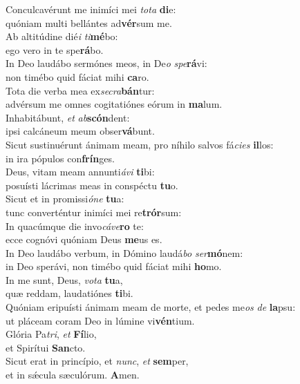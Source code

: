 \evenverse Conculcavérunt me inimíci mei \textit{to}\textit{ta} \textbf{di}e:~\*\\
\evenverse quóniam multi bellántes ad\textbf{vér}sum me.\\
\oddverse Ab altitúdine dié\textit{i} \textit{ti}\textbf{mé}bo:~\*\\
\oddverse ego vero in te spe\textbf{rá}bo.\\
\evenverse In Deo laudábo sermónes meos, in De\textit{o} \textit{spe}\textbf{rá}vi:~\*\\
\evenverse non timébo quid fáciat mihi \textbf{ca}ro.\\
\oddverse Tota die verba mea ex\textit{se}\textit{cra}\textbf{bán}tur:~\*\\
\oddverse advérsum me omnes cogitatiónes eórum in \textbf{ma}lum.\\
\evenverse Inhabitábunt, \textit{et} \textit{ab}\textbf{scón}dent:~\*\\
\evenverse ipsi calcáneum meum obser\textbf{vá}bunt.\\
\oddverse Sicut sustinuérunt ánimam meam, pro níhilo salvos fá\textit{ci}\textit{es} \textbf{il}los:~\*\\
\oddverse in ira pópulos con\textbf{frín}ges.\\
\evenverse Deus, vitam meam annunti\textit{á}\textit{vi} \textbf{ti}bi:~\*\\
\evenverse posuísti lácrimas meas in conspéctu \textbf{tu}o.\\
\oddverse Sicut et in promissi\textit{ó}\textit{ne} \textbf{tu}a:~\*\\
\oddverse tunc converténtur inimíci mei re\textbf{trór}sum:\\
\evenverse In quacúmque die invo\textit{cá}\textit{ve}\textbf{ro} te:~\*\\
\evenverse ecce cognóvi quóniam Deus \textbf{me}us es.\\
\oddverse In Deo laudábo verbum, in Dómino laudá\textit{bo} \textit{ser}\textbf{mó}nem:~\*\\
\oddverse in Deo sperávi, non timébo quid fáciat mihi \textbf{ho}mo.\\
\evenverse In me sunt, Deus, \textit{vo}\textit{ta} \textbf{tu}a,~\*\\
\evenverse quæ reddam, laudatiónes \textbf{ti}bi.\\
\oddverse Quóniam eripuísti ánimam meam de morte, et pedes me\textit{os} \textit{de} \textbf{la}psu:~\*\\
\oddverse ut pláceam coram Deo in lúmine vi\textbf{vén}tium.\\
\evenverse Glória Pa\textit{tri}, \textit{et} \textbf{Fí}lio,~\*\\
\evenverse et Spirítui \textbf{San}cto.\\
\oddverse Sicut erat in princípio, et \textit{nunc}, \textit{et} \textbf{sem}per,~\*\\
\oddverse et in sǽcula sæculórum. \textbf{A}men.\\
